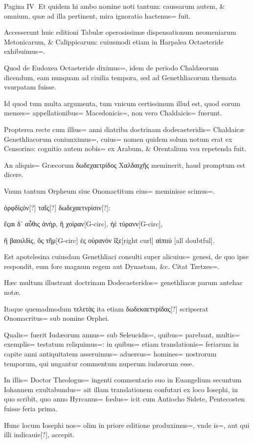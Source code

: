 \begin{parnumbers}
Pagina IV
Et quidem hi ambo nomine noti tantum: caussarum autem, \& omnium, quæ ad illa pertinent, mira ignoratio hactenus= fuit.

Accesserunt huic editioni Tabulæ operosissimæ dispensationum neomeniarum Metonicarum, \& Calippicarum: cuiusmodi etiam in Harpalea Octaeteride exhibuimus=. 

Quod de Eudoxea Octaeteride diximus=, idem de periodo Chaldæorum dicendum, eam nunquam ad ciuilia tempora, sed ad Genethliacorum themata vsurpatam fuisse.

Id quod tum multa argumenta, tum vnicum certissimum illud est, quod eorum menses= appellationibus= Macedonicis=, non vero Chaldaicis= fuerunt.

Propterea recte cum illius= anni diatriba doctrinam dodecaeteridis= Chaldaicæ Genethliacorum coniunximus=, cuius= nomen quidem solum notum erat ex Censorino: cognitio autem nobis= ex Arabum, \& Orentalium vsu repetenda fuit.

An aliquis= Græcorum δωδεχαετρίδος Χαλδαιχῆς meminerit, haud promptum est dicere.

Vnum tantum Orpheum siue Onomactitum eius= meminisse scimus=. 

ὀρφδὶςὀν[?] ταῖς[?] δωδεχαετνρίσιν[?]:

ἔςαι δ᾽ αὖθις ἀνὴρ, ἢ χοίραν[G-circ], ἠὲ τύρανν[G-circ],

ἢ βαοιλδὶς, ὂς τῆμ[G-circ] ἐς οὐρανὸν ἴξε[right curl] αἰπιιύ [all doubtful].

Est apotelesina cuiusdam Genethliaci consulti super alicuius= genesi, de quo ipse respondit, eum fore magnum regem aut Dynastam, \&c. Citat Tzetzes=. 

Hæc multum illustrant doctrinam Dodecaeteridos= genethliacæ parum antehac notæ.

Itaque quemadmodum τελετὰς ita etiam δωδεκαετνρίδας[?] scripserat Onomacritus= sub nomine Orphei.

Qualis= fuerit Iudæorum annus= sub Seleucidis=, quibus= parebant, multis= exemplis= testatum reliquimus=: in quibus= etiam translationis= feriarum in capite anni antiquitatem asseruimus= aduersus= homines= nostrorum temporum, qui nugantur commentum nuperum iudæorum esse.

In illis= Doctor Theologus= ingenti commentario suo in Euangelium secuntum Iohannem exultabundus= ait illam translationem confutari ex loco Iosephi, in quo scribit, quo anno Hyrcanus= fœdus= icit cum Antiocho Sidete, Pentecosten fuisse feria prima.

Hunc locum Iosephi nos= olim in priore editione produximus=, vnde is=, aut qui illi indicauie[?], accepit.


\end{parnumbers}
